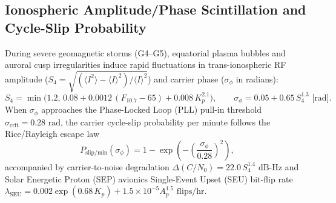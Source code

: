 \documentclass[11pt,a4paper,reqno]{article}
\theoremstyle{plain}
\theoremstyle{definition}
\theoremstyle{remark}
\numberwithin{equation}{section}
\renewcommand{\arraystretch}{1.08}
\begin{document}
\subsection{Ionospheric Amplitude/Phase Scintillation and Cycle-Slip Probability}
During severe geomagnetic storms (G4--G5), equatorial plasma bubbles and auroral cusp irregularities induce rapid fluctuations in trans-ionospheric RF amplitude ($S_4 = \sqrt{(\langle I^2 \rangle - \langle I \rangle^2)/\langle I \rangle^2}$) and carrier phase ($\sigma_\phi$ in radians):
\begin{equation}
  S_4 = \min\!\big(1.2,\, 0.08 + 0.0012\,(F_{10.7} - 65) + 0.008\,K_p^{2.1}\big), \qquad \sigma_\phi = 0.05 + 0.65\,S_4^{1.3}\text{ [rad]}.
  \label{eq:s4_sigmaphi}
\end{equation}
When $\sigma_\phi$ approaches the Phase-Locked Loop (PLL) pull-in threshold $\sigma_{\text{crit}} = 0.28\text{ rad}$, the carrier cycle-slip probability per minute follows the Rice/Rayleigh escape law
\begin{equation}
  P_{\text{slip/min}}(\sigma_\phi) = 1 - \exp\!\left(-\left(\frac{\sigma_\phi}{0.28}\right)^2\right),
  \label{eq:cycle_slip_prob}
\end{equation}
accompanied by carrier-to-noise degradation $\Delta(C/N_0) = 22.0\,S_4^{1.4}\text{ dB-Hz}$ and Solar Energetic Proton (SEP) avionics Single-Event Upset (SEU) bit-flip rate $\lambda_{\text{SEU}} = 0.002\exp(0.68\,K_p) + 1.5 \times 10^{-5} A_p^{1.5}\text{ flips/hr}$.

\begin{table}[H]
\centering
\caption{Quantitative Space-Weather Benchmark Across NOAA SWPC Scenarios ($h = 400\text{ km}$, $B = 0.015\text{ m}^2/\text{kg}$).}
\label{tab:space_weather_benchmarks}
\footnotesize
\setlength{\tabcolsep}{4pt}
\renewcommand{\arraystretch}{1.22}
\end{table}
\end{document}
